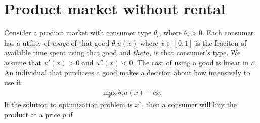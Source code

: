 \documentclass[11pt]{article}
\begin{document}
\section{Product market without rental} 
Consider a product market with consumer type $\theta_i$, where $\theta_i > 0$. 
Each consumer has a utility of \emph{usage} of that good $\theta_i u(x)$ where $x \in [0,1]$ is the fraciton of available time spent using that good and $theta_i$ is that consumer's type.
We assume that $u'(x) > 0$ and $u''(x) < 0$. 
The cost of using a good is linear in $c$. 
An individual that purchases a good makes a decision about how intensively to use it: 
\begin{align}
\max_x \theta_i u(x) - c x.  
\end{align} 
If the solution to optimization problem is $x^*$, then a consumer will buy the product at a price $p$ if 
\end{document}
